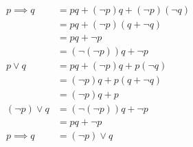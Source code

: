 \documentclass{article}
\begin{document}
	\begin{align}
	p \implies q & = pq + (\neg p)q + (\neg p)(\neg q) \\
	& = pq + (\neg p)(q + \neg q) \\
	& = pq + \neg p \\
	& = (\neg (\neg p))q + \neg p \\
	p \lor q & = pq + (\neg p)q + p(\neg q) \\
	& = (\neg p)q + p(q + \neg q) \\
	& = (\neg p)q + p \\
	(\neg p) \lor q & = (\neg (\neg p))q + \neg p \\
	& = pq + \neg p \\
	p \implies q & = (\neg p) \lor q
	\end{align}
\end{document}
